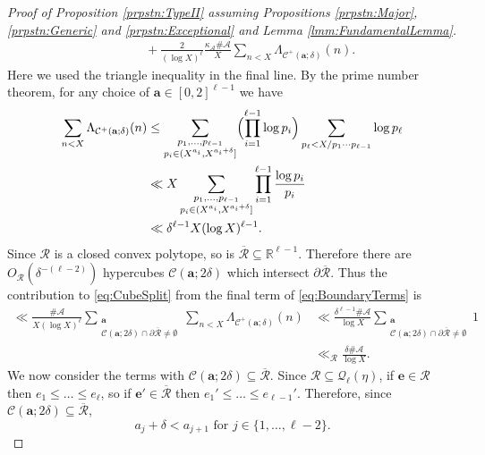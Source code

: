\documentclass[10pt]{amsart}
\theoremstyle{plain}
\numberwithin{sblmm}{thrm}
\numberwithin{equation}{section}
\begin{document}
\begin{proof}[Proof of Proposition \ref{prpstn:TypeII} assuming Propositions \ref{prpstn:Major}, \ref{prpstn:Generic} and \ref{prpstn:Exceptional} and  Lemma \ref{lmm:FundamentalLemma}]
\begin{align}
&\qquad +\frac{2}{(\log{X})^\ell}\frac{\kappa_\mathcal{A}\#\mathcal{A}}{X}\sum_{n<X}\Lambda_{\mathcal{C}^+(\mathbf{a};\delta)}(n).
\label{eq:BoundaryTerms}
\end{align}
Here we used the triangle inequality in the final line. By the prime number theorem, for any choice of $\mathbf{a}\in[0,2]^{\ell-1}$ we have
\begin{align*}
\sum_{n<X}\Lambda_{\mathcal{C}^+(\mathbf{a};\delta)}(n)&\le \sum_{\substack{p_1,\dots,p_{\ell-1}\\ p_i\in (X^{a_i},X^{a_i+\delta}]}}\Bigl(\prod_{i=1}^{\ell-1}\log{p_i}\Bigr)\sum_{p_\ell<X/p_1\cdots p_{\ell-1}}\log{p_{\ell}}\\
&\ll X\sum_{\substack{p_1,\dots,p_{\ell-1}\\ p_i\in (X^{a_i},X^{a_i+\delta}]}}\prod_{i=1}^{\ell-1}\frac{\log{p_i}}{p_i}\\
&\ll \delta^{\ell-1}X(\log{X})^{\ell-1}.
\end{align*}
Since $\mathcal{R}$ is a closed convex polytope, so is $\overline{\mathcal{R}}\subseteq\mathbb{R}^{\ell-1}$. Therefore there are $O_\mathcal{R}(\delta^{-(\ell-2)})$ hypercubes $\mathcal{C}(\mathbf{a};2\delta)$ which intersect $\partial \overline{\mathcal{R}}$. Thus the contribution to \eqref{eq:CubeSplit} from the final term of \eqref{eq:BoundaryTerms} is
\begin{align}
\ll \frac{\#\mathcal{A}}{X(\log{X})^\ell}\sum_{\substack{\mathbf{a}\\ \mathcal{C}(\mathbf{a};2\delta)\cap\partial\overline{\mathcal{R}}\ne\emptyset} }\sum_{n<X}\Lambda_{\mathcal{C}^+(\mathbf{a};\delta)}(n)%
&\ll  \frac{\delta^{\ell-1}\#\mathcal{A}}{\log{X}}\sum_{\substack{\mathbf{a}\\ \mathcal{C}(\mathbf{a};2\delta)\cap\partial\overline{\mathcal{R}}\ne\emptyset} }1\nonumber\\
&\ll_\mathcal{R}  \frac{\delta\#\mathcal{A}}{\log{X}}.\label{eq:BoundaryErrorTerms}
\end{align}
We now consider the terms with $\mathcal{C}(\mathbf{a};2\delta)\subseteq\overline{\mathcal{R}}$. %
Since $\mathcal{R}\subseteq \mathcal{Q}_\ell(\eta)$, if $\mathbf{e}\in\mathcal{R}$ then $e_1\le \dots \le e_\ell$, so if $\mathbf{e}'\in\overline{\mathcal{R}}$ then $e_1'\le \dots \le e_{\ell-1}'$. Therefore, since $\mathcal{C}(\mathbf{a};2\delta)\subseteq\overline{\mathcal{R}}$, %
\begin{equation}
a_j+\delta<a_{j+1}\text{ for }j\in\{1,\dots,\ell-2\}.
\label{eq:CubeCond1}

\end{equation}
\end{proof}
\end{document}
